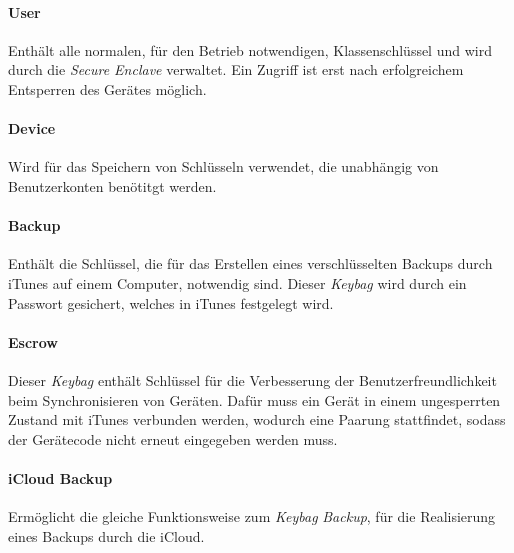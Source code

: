 \paragraph{User}{Enthält alle normalen, für den Betrieb notwendigen, Klassenschlüssel und wird durch die \textit{Secure Enclave} verwaltet. Ein Zugriff ist erst nach erfolgreichem Entsperren des Gerätes möglich. }

\paragraph{Device}{Wird für das Speichern von Schlüsseln verwendet, die unabhängig von Benutzerkonten benötitgt werden.}

\paragraph{Backup}{Enthält die Schlüssel, die für das Erstellen eines verschlüsselten Backups durch iTunes auf einem Computer, notwendig sind. Dieser \textit{Keybag} wird durch ein Passwort gesichert, welches in iTunes festgelegt wird.}

\paragraph{Escrow}{Dieser \textit{Keybag} enthält Schlüssel für die Verbesserung der Benutzerfreundlichkeit beim Synchronisieren von Geräten. Dafür muss ein Gerät in einem ungesperrten Zustand mit iTunes verbunden werden, wodurch eine Paarung stattfindet, sodass der Gerätecode nicht erneut eingegeben werden muss. }

\paragraph{iCloud Backup}{Ermöglicht die gleiche Funktionsweise zum \textit{Keybag} \textit{Backup}, für die Realisierung eines Backups durch die iCloud. }


